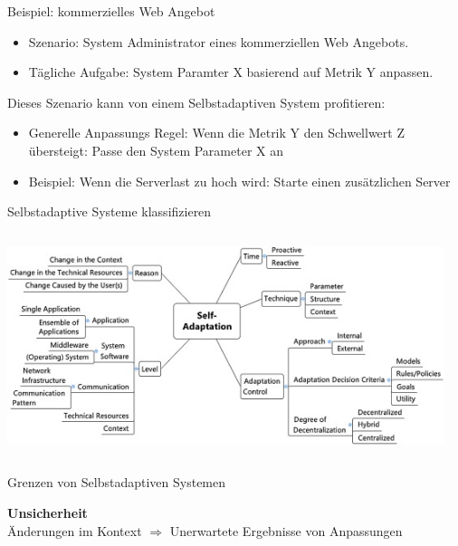 \documentclass[de,16:9]{sdqbeamer}
\begin{document}
\begin{frame}{Beispiel: kommerzielles Web Angebot}
	\begin{itemize}
		\item Szenario: System Administrator eines kommerziellen Web Angebots.
		\item Tägliche Aufgabe: System Paramter X basierend auf Metrik Y anpassen.
	\end{itemize}
	\medskip
	Dieses Szenario kann von einem Selbstadaptiven System profitieren:
	\begin{itemize}
		\item Generelle Anpassungs Regel:
		Wenn die Metrik Y den Schwellwert Z übersteigt: Passe den System Parameter X an
		\item Beispiel: Wenn die Serverlast zu hoch wird: Starte einen zusätzlichen Server
	\end{itemize}
\end{frame}

\begin{frame}{Selbstadaptive Systeme klassifizieren}
	\begin{columns}
		 \begin{center}
			\includegraphics[width=\textwidth]{sources/KrupitzerTaxonomy.jpg}
		\end{center}
		 \cite{SurveyOnEngineeringApproaches}
	\end{columns}
\end{frame}

\begin{frame}{Grenzen von Selbstadaptiven Systemen}
	\begin{center}
		\Large \textbf{Unsicherheit}
		\\ \medskip
		Änderungen im Kontext $\Rightarrow$ Unerwartete Ergebnisse von Anpassungen
	\end{center}
\end{frame}
\end{document}
